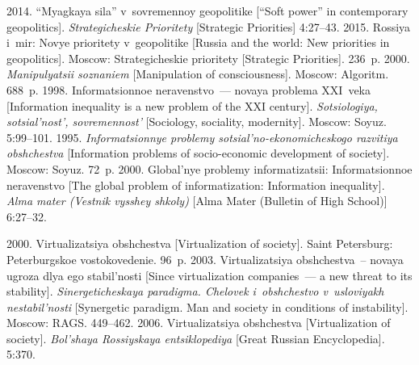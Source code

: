 \begin{multicols}{2}
{{\begin{thebibliography}{99}
       2014. ``Myagkaya sila'' v~sovremennoy geopolitike [``Soft 
power'' in contemporary geopolitics]. \textit{Strategicheskie Prioritety}  [Strategic Priorities] 
4:27--43.
       2015. Rossiya i~mir: Novye prioritety v~geopolitike [Russia and the 
world: New priorities in geopolitics]. Moscow: Strategicheskie prioritety [Strategic Priorities]. 
236~p.
       2000. \textit{Manipulyatsii soznaniem} [Manipulation of 
consciousness]. Moscow: Algoritm. 688~p.
       1998. Informatsionnoe neravenstvo~--- novaya problema 
XXI~veka [Information inequality is a new problem of the XXI century]. \textit{Sotsiologiya, 
sotsial'nost', sovremennost'} [Sociology, sociality, modernity]. 
Moscow: Soyuz. 5:99--101.
       1995. \textit{Informatsionnye problemy sotsial'no-ekonomicheskogo 
razvitiya obshchestva} [Information problems of socio-economic development of society]. 
Moscow: Soyuz. 72~p.
       2000. Global'nye problemy informatizatsii: Informatsionnoe 
neravenstvo [The global problem of informatization: Information inequality]. \textit{Alma mater 
(Vestnik vysshey shkoly)}  [Alma Mater (Bulletin of High School)] 6:27--32.
     
     
       2000. Virtualizatsiya obshchestva 
      [Virtualization of society]. Saint Petersburg: 
Peterburgskoe vostokovedenie. 96~p.
       2003. Virtualizatsiya obshchestva~-- novaya ugroza dlya ego 
stabil'nosti [Since virtualization companies~--- a new threat to its stability]. 
\textit{Sinergeticheskaya paradigma. Chelovek i~obshchestvo v~usloviyakh 
nestabil'nosti} [Synergetic paradigm. Man and society in conditions of instability]. 
Moscow: RAGS. 449--462.
       2006. Virtualizatsiya obshchestva [Virtualization of society]. 
\textit{Bol'shaya Rossiyskaya entsiklopediya} [Great Russian Encyclopedia]. 5:370.
      

\end{thebibliography}}}
\end{multicols}
